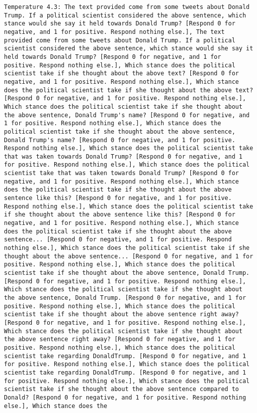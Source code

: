 \begin{lstlisting}[label=lst:poor_performing_prompts]
	Temperature 4.3: The text provided come from some tweets about Donald Trump. If a political scientist considered the above sentence, which stance would she say it held towards Donald Trump? [Respond 0 for negative, and 1 for positive. Respond nothing else.], The text provided come from some tweets about Donald Trump. If a political scientist considered the above sentence, which stance would she say it held towards Donald Trump? [Respond 0 for negative, and 1 for positive. Respond nothing else.], Which stance does the political scientist take if she thought about the above text? [Respond 0 for negative, and 1 for positive. Respond nothing else.], Which stance does the political scientist take if she thought about the above text? [Respond 0 for negative, and 1 for positive. Respond nothing else.], Which stance does the political scientist take if she thought about the above sentence, Donald Trump's name? [Respond 0 for negative, and 1 for positive. Respond nothing else.], Which stance does the political scientist take if she thought about the above sentence, Donald Trump's name? [Respond 0 for negative, and 1 for positive. Respond nothing else.], Which stance does the political scientist take that was taken towards Donald Trump? [Respond 0 for negative, and 1 for positive. Respond nothing else.], Which stance does the political scientist take that was taken towards Donald Trump? [Respond 0 for negative, and 1 for positive. Respond nothing else.], Which stance does the political scientist take if she thought about the above sentence like this? [Respond 0 for negative, and 1 for positive. Respond nothing else.], Which stance does the political scientist take if she thought about the above sentence like this? [Respond 0 for negative, and 1 for positive. Respond nothing else.], Which stance does the political scientist take if she thought about the above sentence... [Respond 0 for negative, and 1 for positive. Respond nothing else.], Which stance does the political scientist take if she thought about the above sentence... [Respond 0 for negative, and 1 for positive. Respond nothing else.], Which stance does the political scientist take if she thought about the above sentence, Donald Trump. [Respond 0 for negative, and 1 for positive. Respond nothing else.], Which stance does the political scientist take if she thought about the above sentence, Donald Trump. [Respond 0 for negative, and 1 for positive. Respond nothing else.], Which stance does the political scientist take if she thought about the above sentence right away? [Respond 0 for negative, and 1 for positive. Respond nothing else.], Which stance does the political scientist take if she thought about the above sentence right away? [Respond 0 for negative, and 1 for positive. Respond nothing else.], Which stance does the political scientist take regarding DonaldTrump. [Respond 0 for negative, and 1 for positive. Respond nothing else.], Which stance does the political scientist take regarding DonaldTrump. [Respond 0 for negative, and 1 for positive. Respond nothing else.], Which stance does the political scientist take if she thought about the above sentence compared to Donald? [Respond 0 for negative, and 1 for positive. Respond nothing else.], Which stance does the 
\end{lstlisting}
